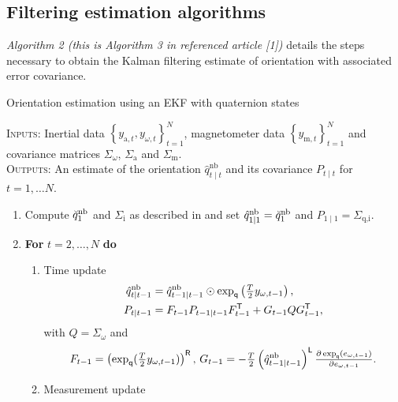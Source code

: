 \documentclass{article}
\begin{document}
\subsection{Filtering estimation algorithms}

\textit{Algorithm 2 (this is Algorithm 3 in referenced article [1])} details the steps necessary to
obtain the Kalman filtering estimate of orientation with associated error covariance.

\begin{algorithm}[ht]
  \caption{\textsf{Orientation estimation using an EKF with quaternion states}}
  \label{alg:oriEst-ekfQuat}
  \small
  \textsc{Inputs:} Inertial data $\left\{ y_{\text{a},t}, y_{\omega,t} \right\}_{t=1}^N$, magnetometer data $\left\{ y_{\text{m},t}\right\}_{t=1}^N$ and covariance matrices $\Sigma_\omega$, $\Sigma_\text{a}$ and $\Sigma_\text{m}$. \\
  \textsc{Outputs:} An estimate of the orientation $\hat{q}^\text{nb}_{t \mid t}$ and its covariance $P_{t \mid t}$ for $t = 1, \hdots N$.
  \algrule[.4pt]
  \begin{enumerate}
  \item Compute $\breve{q}^\text{nb}_{1}$ and $\Sigma_\text{i}$ as described in  and set $\hat{q}_{1 \mid 1}^\text{nb} = \breve{q}_{1}^\text{nb}$ and $P_{1 \mid 1} = \Sigma_\text{q,i}$.
  \item \textbf{For} $t = 2, \hdots, N$ \textbf{do}
  \begin{enumerate}
  \item Time update
  \begin{subequations}
  \begin{align}
  \hat{q}^\text{nb}_{t \mid t-1} &= \hat{q}^\text{nb}_{t-1 \mid t-1} \odot \expq \left( \tfrac{T}{2} y_{\omega,t-1} \right), \\
  P_{t \mid t-1} &= F_{t-1} P_{t-1 \mid t-1} F_{t-1}^\Transp + G_{t-1} Q G_{t-1}^\Transp, \label{eq:quatEKF_TPupdate} %
  \end{align}%
  \label{eq:ori_qEkf_timeUpdate}%
  \end{subequations}%
  with $Q = \Sigma_\omega$ and 
  \begin{align*}
  F_{t-1} = \left( \exp_\mathsf{q} (\tfrac{T}{2} y_{\omega,t-1}) \right)^{\mathsf{R}}, \, G_{t-1} = -\tfrac{T}{2} \left( \hat{q}^{\text{nb}}_{t-1 \mid t-1} \right)^{\mathsf{L}} \tfrac{\partial \exp_\mathsf{q} (e_{\omega,t-1})}{\partial e_{\omega,t-1}}.
  \end{align*}
  \item Measurement update

\end{enumerate}
\end{enumerate}
\end{algorithm}
\end{document}

